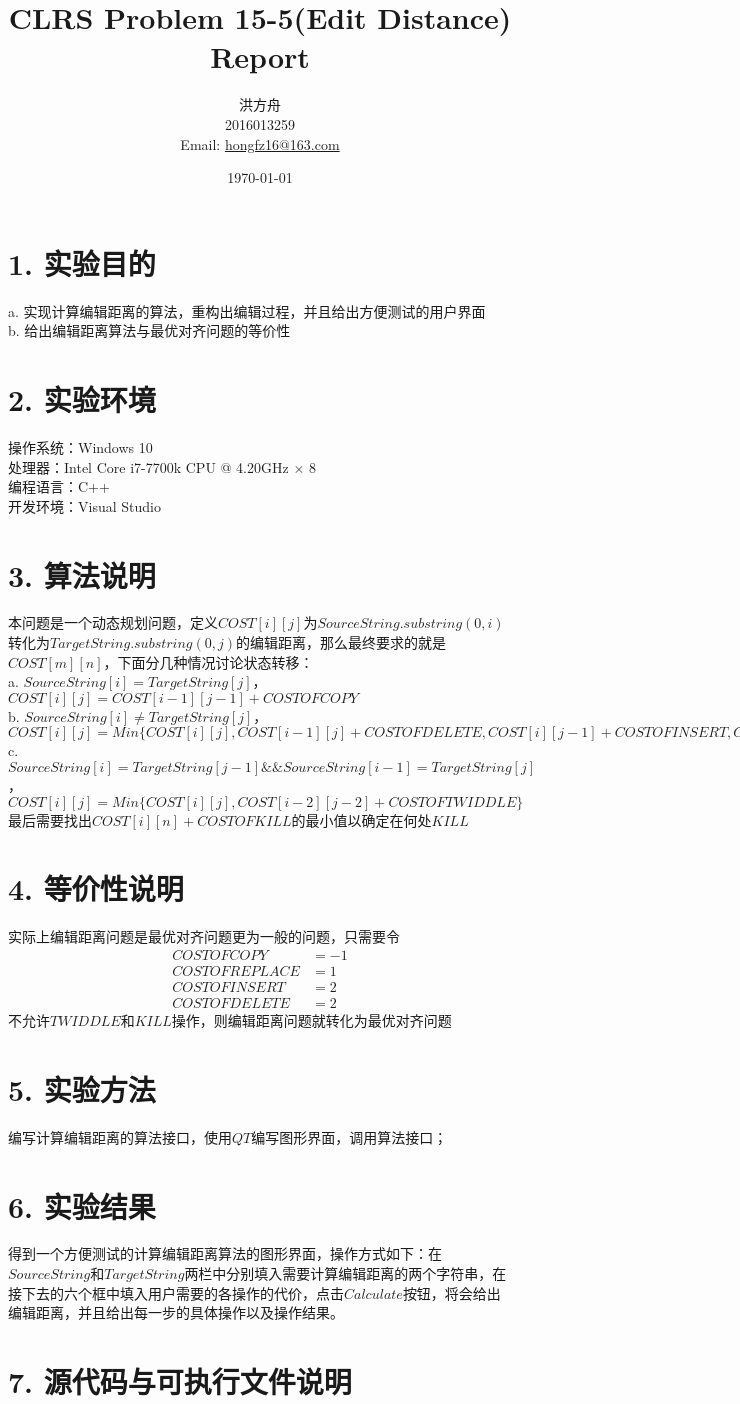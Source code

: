 \documentclass[12pt]{article}
\title{CLRS Problem 15-5(Edit Distance) Report}
\author{洪方舟\\2016013259\\Email: \href{mailto:hongfz16@163.com}{hongfz16@163.com}}
\date{\today}
\begin{document}
  \maketitle
  \section*{1. 实验目的}
  a. 实现计算编辑距离的算法，重构出编辑过程，并且给出方便测试的用户界面\\
  b. 给出编辑距离算法与最优对齐问题的等价性
  \section*{2. 实验环境}
  操作系统：Windows 10\\
  处理器：Intel Core i7-7700k CPU @ 4.20GHz $\times$ 8\\
  编程语言：C++\\
  开发环境：Visual Studio
  \section*{3. 算法说明}
  本问题是一个动态规划问题，定义$COST[i][j]$为$SourceString.substring(0,i)$转化为$TargetString.substring(0,j)$的编辑距离，那么最终要求的就是$COST[m][n]$，下面分几种情况讨论状态转移：\\
  a. $SourceString[i] = TargetString[j]$，$COST[i][j]=COST[i-1][j-1]+COSTOFCOPY$\\
  b. $SourceString[i] \neq TargetString[j]$，$COST[i][j]=Min\{COST[i][j], COST[i-1][j]+COSTOFDELETE, COST[i][j-1]+COSTOFINSERT, COST[i-1][j-1]+COSTOFREPLACE\}$\\
  c. $SourceString[i]=TargetString[j-1] \&\& SourceString[i-1]=TargetString[j]$，$COST[i][j]=Min\{COST[i][j], COST[i-2][j-2]+COSTOFTWIDDLE\}$\\
  最后需要找出$COST[i][n]+COSTOFKILL$的最小值以确定在何处$KILL$
  \section*{4. 等价性说明}
  实际上编辑距离问题是最优对齐问题更为一般的问题，只需要令
  \begin{align*}
    COSTOFCOPY &= -1 \\
    COSTOFREPLACE &= 1 \\
    COSTOFINSERT &= 2 \\
    COSTOFDELETE &= 2
  \end{align*}
  不允许$TWIDDLE$和$KILL$操作，则编辑距离问题就转化为最优对齐问题
  \section*{5. 实验方法}
  编写计算编辑距离的算法接口，使用$QT$编写图形界面，调用算法接口；
  \section*{6. 实验结果}
  得到一个方便测试的计算编辑距离算法的图形界面，操作方式如下：在$Source String$和$Target String$两栏中分别填入需要计算编辑距离的两个字符串，在接下去的六个框中填入用户需要的各操作的代价，点击$Calculate$按钮，将会给出编辑距离，并且给出每一步的具体操作以及操作结果。
  \section*{7. 源代码与可执行文件说明}
\end{document}
